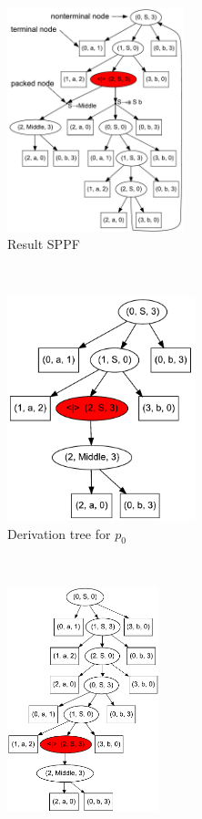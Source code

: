 \begin{figure}
    \begin{center}
    \centering
    \begin{subfigure}[b]{0.33\textwidth}
         \includegraphics[height=6.5cm]{dot/AnBn.pdf}
        \caption{Result SPPF}
        \label{SPPF}        
    \end{subfigure}
    ~
    \begin{subfigure}[b]{0.33\textwidth}
        \includegraphics[height=6.5cm]{dot/AnBn_2.pdf}
        \caption{Derivation tree for $p_0$}
        \label{tree1}        
    \end{subfigure}
    ~
    \begin{subfigure}[b]{0.33\textwidth}
        \includegraphics[height=6.5cm]{dot/AnBn_1.pdf}

\end{subfigure}
\end{center}
\end{figure}
